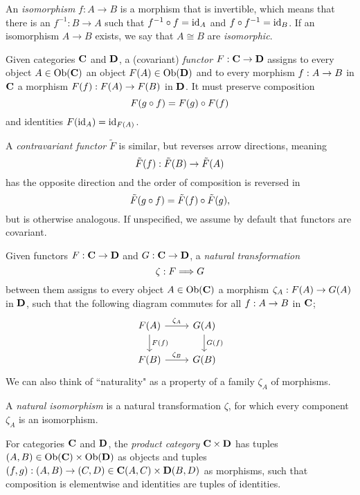 \begin{doublecol}
    An \emph{isomorphism} $f: A \to B$ is a morphism that is invertible, which means that there is an $f^{-1}: B \to A$ such that $f^{-1} \circ f = \mathrm{id}_{A}$ and $f \circ f^{-1} = \mathrm{id}_{B}$.
    If an isomorphism $A \to B$ exists, we say that $A \cong B$ are \emph{isomorphic}.
    
    Given categories $\mathbf{C}$ and $\mathbf{D}$, a (covariant) \emph{functor} $F: \mathbf{C} \to \mathbf{D}$ assigns to every object $A \in \mathrm{Ob}(\mathbf{C})$ an object $F(A) \in \mathrm{Ob}(\mathbf{D})$ and to every morphism $f: A \to B$ in $\mathbf{C}$ a morphism $F(f): F(A) \to F(B)$ in $\mathbf{D}$. It must preserve composition
    $$F(g \circ f) = F(g) \circ F(f)$$ and identities $F(\mathrm{id}_{A}) = \mathrm{id}_{F(A)}$.

    A \emph{contravariant functor} $\tilde F$ is similar, but reverses arrow directions, meaning $$\tilde{F}(f): \tilde{F}(B) \to \tilde{F}(A)$$ has the opposite direction and the order of composition is reversed in $$\tilde F(g \circ f) = \tilde F(f) \circ \tilde F(g),$$ but is otherwise analogous.
    If unspecified, we assume by default that functors are covariant.
\end{doublecol}
\begin{extendrightcol}
    Given functors $F: \mathbf{C} \to \mathbf{D}$ and $G: \mathbf{C} \to \mathbf{D}$, a \emph{natural transformation}
    $$\zeta: F \Longrightarrow G$$ between them assigns to every object $A \in \mathrm{Ob}(\mathbf{C})$
    a morphism $\zeta_A: F(A) \to G(A)$ in $\mathbf{D}$, such that the following diagram commutes
    for all $f: A \to B$ in $\mathbf{C}$;
    \begin{equation}
        \label{nonabelian:basics:cd_naturality}
        \begin{tikzcd}[ampersand replacement=\&]
            F(A) \arrow[d, "F(f)"] \arrow[r, "\zeta_A"] \& G(A) \arrow[d, "G(f)"] \\
            F(B) \arrow[r, "\zeta_B"] \& G(B)
        \end{tikzcd}
    \end{equation}
    We can also think of ``naturality" as a property of a family $\zeta_A$ of morphisms.

    A \emph{natural isomorphism} is a natural transformation $\zeta$, for which every component $\zeta_A$ is an isomorphism.

    For categories $\mathbf{C}$ and $\mathbf{D}$, the \emph{product category} $\mathbf{C} \times \mathbf{D}$ has tuples $(A, B) \in \mathrm{Ob}(\mathbf{C}) \times \mathrm{Ob}(\mathbf{D})$ as objects and tuples $(f, g): (A, B) \to (C, D) \in \mathbf{C}(A, C) \times \mathbf{D}(B, D)$ as morphisms, such that composition is elementwise and identities are tuples of identities.
\end{extendrightcol}



